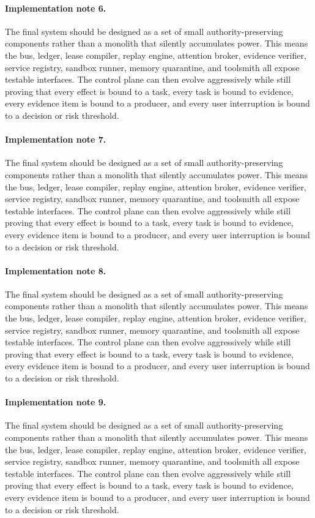 \documentclass[10pt,journal,onecolumn]{IEEEtran}
\begin{document}
\paragraph{Implementation note 6.} The final system should be designed as a set of small authority-preserving components rather than a monolith that silently accumulates power. This means the bus, ledger, lease compiler, replay engine, attention broker, evidence verifier, service registry, sandbox runner, memory quarantine, and toolsmith all expose testable interfaces. The control plane can then evolve aggressively while still proving that every effect is bound to a task, every task is bound to evidence, every evidence item is bound to a producer, and every user interruption is bound to a decision or risk threshold.
\paragraph{Implementation note 7.} The final system should be designed as a set of small authority-preserving components rather than a monolith that silently accumulates power. This means the bus, ledger, lease compiler, replay engine, attention broker, evidence verifier, service registry, sandbox runner, memory quarantine, and toolsmith all expose testable interfaces. The control plane can then evolve aggressively while still proving that every effect is bound to a task, every task is bound to evidence, every evidence item is bound to a producer, and every user interruption is bound to a decision or risk threshold.
\paragraph{Implementation note 8.} The final system should be designed as a set of small authority-preserving components rather than a monolith that silently accumulates power. This means the bus, ledger, lease compiler, replay engine, attention broker, evidence verifier, service registry, sandbox runner, memory quarantine, and toolsmith all expose testable interfaces. The control plane can then evolve aggressively while still proving that every effect is bound to a task, every task is bound to evidence, every evidence item is bound to a producer, and every user interruption is bound to a decision or risk threshold.
\paragraph{Implementation note 9.} The final system should be designed as a set of small authority-preserving components rather than a monolith that silently accumulates power. This means the bus, ledger, lease compiler, replay engine, attention broker, evidence verifier, service registry, sandbox runner, memory quarantine, and toolsmith all expose testable interfaces. The control plane can then evolve aggressively while still proving that every effect is bound to a task, every task is bound to evidence, every evidence item is bound to a producer, and every user interruption is bound to a decision or risk threshold.
\end{document}
